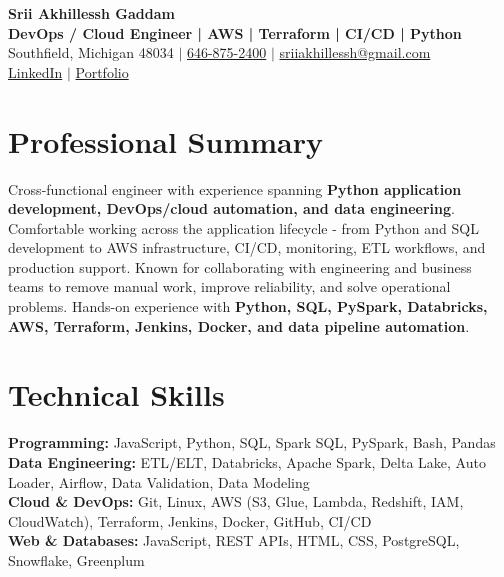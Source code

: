 \documentclass[letterpaper,10pt]{article}
\begin{document}
\fontsize{9.35pt}{10.45pt}\selectfont

\begin{center}
    {\LARGE \textbf{Srii Akhillessh Gaddam}} \\[-1pt]
    \textbf{DevOps / Cloud Engineer | AWS | Terraform | CI/CD | Python} \\[2pt]
    Southfield, Michigan 48034 $|$
    \href{tel:6468752400}{646-875-2400} $|$
    \href{mailto:sriiakhillessh@gmail.com}{sriiakhillessh@gmail.com} \\[1pt]
    \href{https://www.linkedin.com/in/srii-akhiilessh-gaddam-b48668191/}{LinkedIn} $|$
    \href{https://sriiakhillesshg.github.io/portfolio/}{Portfolio}
\end{center}
\vspace{-8pt}

\section{Professional Summary}
\small{Cross-functional engineer with experience spanning \textbf{Python application development, DevOps/cloud automation, and data engineering}. Comfortable working across the application lifecycle - from Python and SQL development to AWS infrastructure, CI/CD, monitoring, ETL workflows, and production support. Known for collaborating with engineering and business teams to remove manual work, improve reliability, and solve operational problems. Hands-on experience with \textbf{Python, SQL, PySpark, Databricks, AWS, Terraform, Jenkins, Docker, and data pipeline automation}.}

\section{Technical Skills}
\small{
\textbf{Programming:} JavaScript, Python, SQL, Spark SQL, PySpark, Bash, Pandas \\
\textbf{Data Engineering:} ETL/ELT, Databricks, Apache Spark, Delta Lake, Auto Loader, Airflow, Data Validation, Data Modeling \\
\textbf{Cloud \& DevOps:} Git, Linux, AWS (S3, Glue, Lambda, Redshift, IAM, CloudWatch), Terraform, Jenkins, Docker, GitHub, CI/CD \\
\textbf{Web \& Databases:} JavaScript, REST APIs, HTML, CSS, PostgreSQL, Snowflake, Greenplum
}
\end{document}
